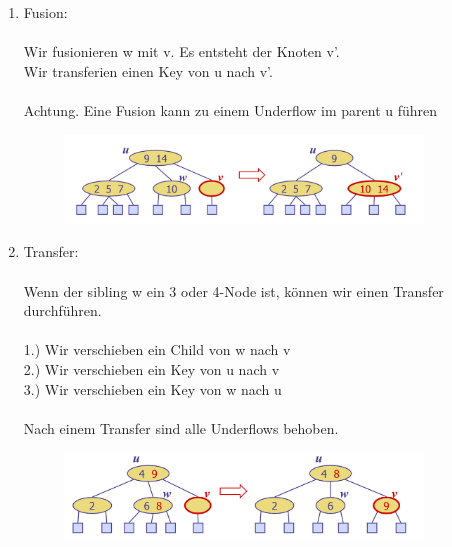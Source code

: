 \documentclass[a4paper,10pt]{report}
\begin{document}
\begin{enumerate}
	\item
		Fusion:\\
		\\
		Wir fusionieren w mit v. Es entsteht der Knoten v'.\\ 
		Wir transferien einen Key von u nach v'.\\
		\\
		Achtung. Eine Fusion kann zu einem Underflow im parent u führen
		\begin{figure}[H]
			\begin{center}
  				\includegraphics[width=0.9\textwidth]{img/underflow1.png}
			\end{center}
		\end{figure}
	\item
		Transfer:\\
		\\
		Wenn der sibling w ein 3 oder 4-Node ist, können wir einen Transfer durchführen.\\
		\\
		1.) Wir verschieben ein Child von w nach v\\
		2.) Wir verschieben ein Key von u nach v\\
		3.) Wir verschieben ein Key von w nach u\\
		\\
		Nach einem Transfer sind alle Underflows behoben.
		\begin{figure}[H]
			\begin{center}
  				\includegraphics[width=0.9\textwidth]{img/underflow2.png}
			\end{center}
		\end{figure}
\end{enumerate}
\newpage
\end{document}
